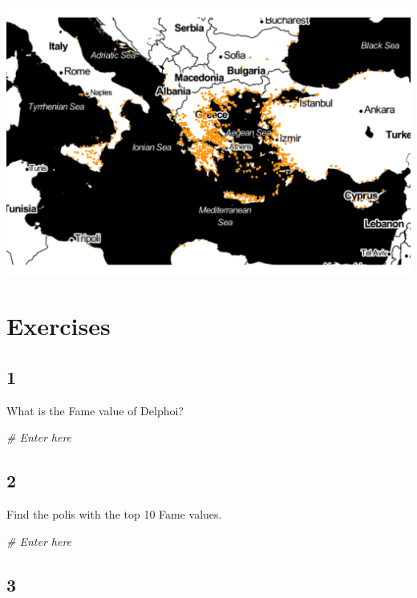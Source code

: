 \documentclass[
]{book}
\newenvironment{Shaded}{\begin{snugshade}}{\end{snugshade}}
\newcommand{\CommentTok}[1]{\textcolor[rgb]{0.56,0.35,0.01}{\textit{#1}}}
\theoremstyle{definition}
\theoremstyle{definition}
\theoremstyle{definition}
\theoremstyle{remark}
\begin{document}
\includegraphics{images/ober_ggmap_polis.png}

\hypertarget{exercises}{%
\section*{Exercises}\label{exercises}}

\hypertarget{section}{%
\subsection*{1}\label{section}}

What is the Fame value of Delphoi?

\begin{Shaded}
\begin{Highlighting}[]
\CommentTok{\# Enter here}
\end{Highlighting}
\end{Shaded}

\hypertarget{section-1}{%
\subsection*{2}\label{section-1}}

Find the polis with the top 10 Fame values.

\begin{Shaded}
\begin{Highlighting}[]
\CommentTok{\# Enter here}
\end{Highlighting}
\end{Shaded}

\hypertarget{section-2}{%
\subsection*{3}\label{section-2}}
\end{document}
